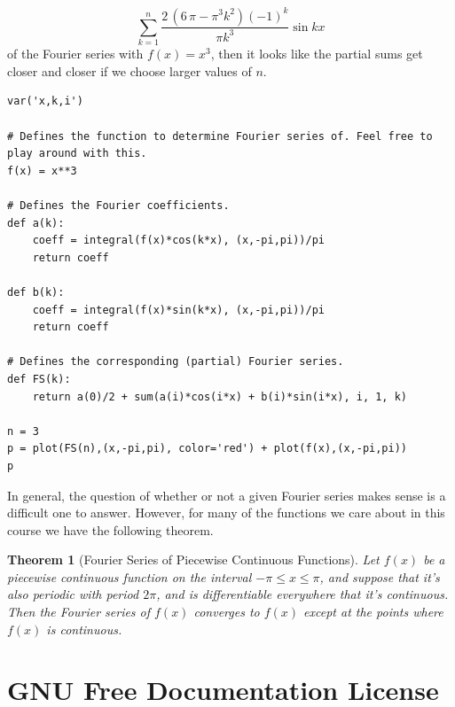 \documentclass[10pt,]{book}
\theoremstyle{plain}
\newtheorem{theorem}{Theorem}[section]
\theoremstyle{definition}
\theoremstyle{definition}
\numberwithin{equation}{section}
\begin{document}
            \begin{equation*}
                \sum_{k=1}^{n}\frac{2 \, {\left(6 \, \pi - \pi^{3} k^{2}\right)} \left(-1\right)^{k}}{\pi k^{3}}\sin kx
            \end{equation*}
            of the Fourier series with \(f(x) = x^{3}\), then it looks like the partial sums get closer and closer if we choose larger values of \(n\).%
\begin{lstlisting}[style=sageinput]
var('x,k,i')

# Defines the function to determine Fourier series of. Feel free to play around with this.
f(x) = x**3

# Defines the Fourier coefficients.
def a(k):
    coeff = integral(f(x)*cos(k*x), (x,-pi,pi))/pi
    return coeff

def b(k):
    coeff = integral(f(x)*sin(k*x), (x,-pi,pi))/pi
    return coeff

# Defines the corresponding (partial) Fourier series.
def FS(k): 
    return a(0)/2 + sum(a(i)*cos(i*x) + b(i)*sin(i*x), i, 1, k)

n = 3
p = plot(FS(n),(x,-pi,pi), color='red') + plot(f(x),(x,-pi,pi))
p
\end{lstlisting}
\par
In general, the question of whether or not a given Fourier series makes sense is a difficult one to answer.
However, for many of the functions we care about in this course we have the following theorem.%
\begin{theorem}[{Fourier Series of Piecewise Continuous Functions}]\label{theorem-pointwise-convergence-of-fourier-series}
                        Let \(f(x)\) be a piecewise continuous function on the interval \(-\pi\leq x\leq\pi\), and suppose that it's also periodic with period \(2\pi\), and is differentiable everywhere that it's continuous. Then the Fourier series of \(f(x)\) converges to \(f(x)\) except at the points where \(f(x)\) is continuous.
                    \end{theorem}
%
%
%
\appendix
%
\typeout{************************************************}
\typeout{************************************************}
\chapter[{GNU Free Documentation License}]{GNU Free Documentation License}\label{appendix-gfdl}
\typeout{************************************************}
\typeout{************************************************}
\end{document}
